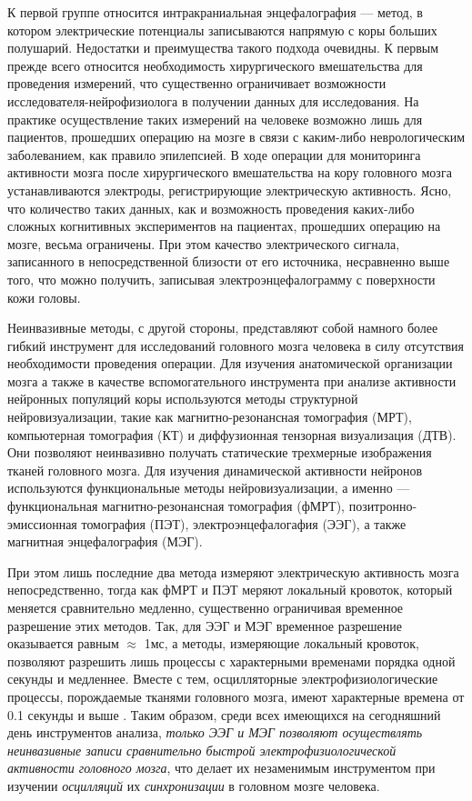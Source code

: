 К первой группе относится интракраниальная энцефалография --- метод,
в котором электрические потенциалы записываются напрямую с коры больших полушарий.
Недостатки и преимущества такого подхода очевидны. К первым прежде всего относится необходимость
хирургического вмешательства для проведения измерений, что существенно ограничивает возможности
исследователя-нейрофизиолога в получении данных для исследования.
На практике осуществление таких измерений на человеке возможно лишь для пациентов,
прошедших операцию на мозге в связи с каким-либо неврологическим заболеванием, как правило эпилепсией.
В ходе операции для мониторинга активности мозга после хирургического вмешательства на кору головного
мозга устанавливаются электроды, регистрирующие электрическую активность.
Ясно, что количество таких данных, как и  возможность проведения каких-либо сложных
когнитивных экспериментов на пациентах, прошедших операцию на мозге, весьма ограничены.
При этом качество электрического сигнала, записанного в непосредственной близости от его источника,
несравненно выше того, что можно получить, записывая электроэнцефалограмму с поверхности кожи головы.

Неинвазивные методы, с другой стороны, представляют собой намного более гибкий инструмент
для исследований головного мозга человека в силу отсутствия необходимости проведения операции.
Для изучения анатомической организации мозга а также в качестве вспомогательного инструмента
при анализе активности нейронных популяций коры используются методы структурной нейровизуализации,
такие как магнитно-резонансная томография (МРТ),
компьютерная томография (КТ) и диффузионная тензорная визуализация (ДТВ).
Они позволяют неинвазивно получать статические трехмерные изображения тканей головного мозга.
Для изучения динамической активности нейронов используются функциональные методы нейровизуализации,
а именно ---  функциональная магнитно-резонансная томография (фМРТ),
позитронно-эмиссионная томография (ПЭТ), электроэнцефалогафия (ЭЭГ), а также магнитная энцефалография (МЭГ).

При этом лишь последние два метода измеряют электрическую активность мозга непосредственно,
тогда как фМРТ и ПЭТ меряют локальный кровоток, который меняется сравнительно медленно,
существенно ограничивая временное разрешение этих методов.
Так, для ЭЭГ и МЭГ временное разрешение оказывается равным $\approx$ 1мс, а методы,
измеряющие локальный кровоток, позволяют разрешить лишь процессы с характерными временами
порядка одной секунды и медленнее. Вместе с тем, осцилляторные электрофизиологические процессы, порождаемые
тканями головного мозга, имеют характерные времена от 0.1 секунды и выше .
Таким образом, среди всех имеющихся на сегодняшний день инструментов анализа, \emph{только ЭЭГ и МЭГ
позволяют осуществлять неинвазивные записи сравнительно быстрой электрофизиологической
активности головного мозга}, что делает их незаменимым инструментом при изучении \emph{осцилляций}
их \emph{синхронизации} в головном мозге человека.

